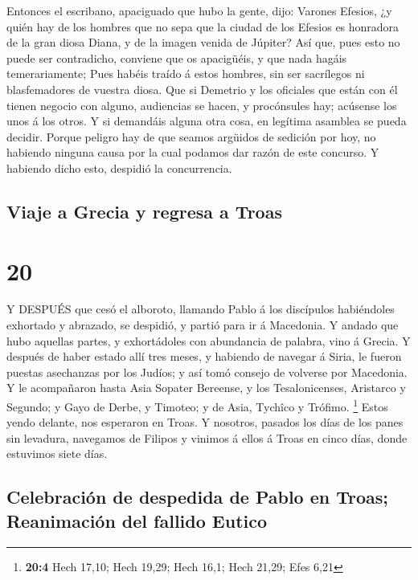  Entonces el escribano, apaciguado que hubo la gente, dijo:
Varones Efesios, ¿y quién hay de los hombres que no sepa que la ciudad
de los Efesios es honradora de la gran diosa Diana, y de la imagen
venida de Júpiter?  Así que, pues esto no puede ser
contradicho, conviene que os apacigüéis, y que nada hagáis
temerariamente;  Pues habéis traído á estos hombres, sin
ser sacrílegos ni blasfemadores de vuestra diosa.  Que si
Demetrio y los oficiales que están con él tienen negocio con alguno,
audiencias se hacen, y procónsules hay; acúsense los unos á los otros.
 Y si demandáis alguna otra cosa, en legítima asamblea se
pueda decidir.  Porque peligro hay de que seamos argüidos
de sedición por hoy, no habiendo ninguna causa por la cual podamos dar
razón de este concurso. Y habiendo dicho esto, despidió la concurrencia.

\hypertarget{viaje-a-grecia-y-regresa-a-troas}{%
\subsection{Viaje a Grecia y regresa a
Troas}\label{viaje-a-grecia-y-regresa-a-troas}}

\hypertarget{section-19}{%
\section{20}\label{section-19}}

 Y DESPUÉS que cesó el alboroto, llamando Pablo á los
discípulos habiéndoles exhortado y abrazado, se despidió, y partió para
ir á Macedonia.  Y andado que hubo aquellas partes, y
exhortádoles con abundancia de palabra, vino á Grecia.  Y
después de haber estado allí tres meses, y habiendo de navegar á Siria,
le fueron puestas asechanzas por los Judíos; y así tomó consejo de
volverse por Macedonia.  Y le acompañaron hasta Asia Sopater
Bereense, y los Tesalonicenses, Aristarco y Segundo; y Gayo de Derbe, y
Timoteo; y de Asia, Tychîco y Trófimo. \footnote{\textbf{20:4} Hech
  17,10; Hech 19,29; Hech 16,1; Hech 21,29; Efes 6,21} 
Estos yendo delante, nos esperaron en Troas.  Y nosotros,
pasados los días de los panes sin levadura, navegamos de Filipos y
vinimos á ellos á Troas en cinco días, donde estuvimos siete días.

\hypertarget{celebraciuxf3n-de-despedida-de-pablo-en-troas-reanimaciuxf3n-del-fallido-eutico}{%
\subsection{Celebración de despedida de Pablo en Troas; Reanimación del
fallido
Eutico}\label{celebraciuxf3n-de-despedida-de-pablo-en-troas-reanimaciuxf3n-del-fallido-eutico}}

